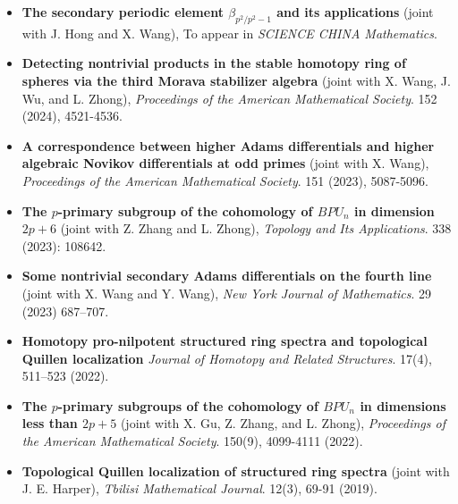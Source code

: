\documentclass[12pt,a4paper,sans,fontset=windows]{moderncv} %
\begin{document}
\begin{itemize}[wide=30pt, leftmargin=*]
    \item \textbf{The secondary periodic element $\beta_{p^2/p^2-1}$ and its applications}
        \newline (joint with J. Hong and X. Wang), To appear in \textit{SCIENCE CHINA Mathematics}.   
    \item \textbf{Detecting nontrivial products in the stable homotopy ring of spheres via the third Morava stabilizer algebra}
    \newline (joint with X. Wang, J. Wu, and L. Zhong), \textit{Proceedings of the American Mathematical Society}. 152 (2024), 4521-4536.
    \item \textbf{A correspondence between higher Adams differentials and higher algebraic Novikov differentials at odd primes}
        \newline (joint with X. Wang),  \textit{Proceedings of the American Mathematical Society}. 151 (2023), 5087-5096. 
    \item \textbf{The $p$-primary subgroup of the cohomology of $BPU_n$ in dimension $2p+6$}
        \newline (joint with Z. Zhang and L. Zhong), \textit{Topology and Its Applications}.  338 (2023): 108642.
    \item \textbf{Some nontrivial secondary Adams differentials on the fourth line}
        \newline (joint with X. Wang and Y. Wang),  \textit{New York Journal of Mathematics}.  29 (2023) 687–707.
    \item \textbf{Homotopy pro-nilpotent structured ring spectra and topological Quillen localization}
        \newline \textit{Journal of Homotopy and Related Structures}. 17(4), 511–523 (2022).
    \item \textbf{The $p$-primary subgroups of the cohomology of $BPU_n$ in dimensions less than $2p+5$}
        \newline (joint with X. Gu, Z. Zhang, and L. Zhong), \textit{Proceedings of the American Mathematical Society}. 150(9), 4099-4111 (2022). 
    \item \textbf{Topological Quillen localization of structured ring spectra}
        \newline (joint with J. E. Harper), \textit{Tbilisi Mathematical Journal}. 12(3), 69-91 (2019). 
\end{itemize}

\vspace{2pt} 
\end{document}

